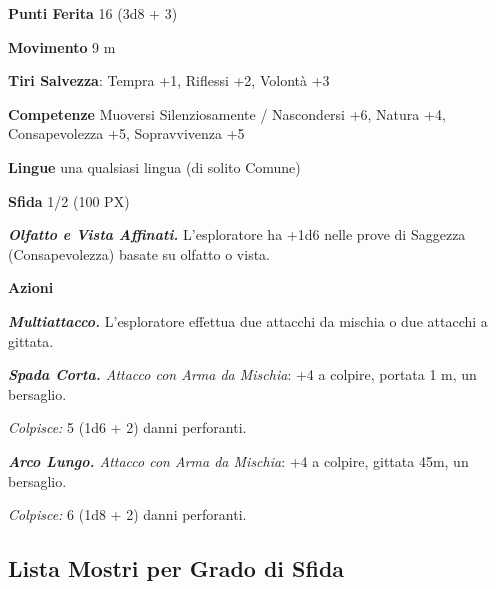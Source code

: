 \begin{multicols}{2}
\textbf{Punti Ferita} 16 (3d8 + 3)

\textbf{Movimento} 9 m

\textbf{Tiri Salvezza}: Tempra +1, Riflessi +2, Volontà +3

\textbf{Competenze} Muoversi Silenziosamente / Nascondersi +6, Natura +4, Consapevolezza +5, Sopravvivenza +5

\textbf{Lingue} una qualsiasi lingua (di solito Comune)

\textbf{Sfida} 1/2 (100 PX)

\textit{\textbf{Olfatto e Vista Affinati.}} L'esploratore ha +1d6 nelle prove di Saggezza (Consapevolezza) basate su olfatto o vista.

\textbf{Azioni}

\textit{\textbf{Multiattacco.}} L'esploratore effettua due attacchi da mischia o due attacchi a gittata.

\textit{\textbf{Spada Corta.} Attacco con Arma da Mischia}: +4 a colpire, portata 1 m, un bersaglio.

\textit{Colpisce:} 5 (1d6 + 2) danni perforanti.

\textit{\textbf{Arco Lungo.} Attacco con Arma da Mischia}: +4 a colpire, gittata 45m, un bersaglio.

\textit{Colpisce:} 6 (1d8 + 2) danni perforanti.


\end{multicols}

%

\pagebreak

\subsection{Lista Mostri per Grado di Sfida}



